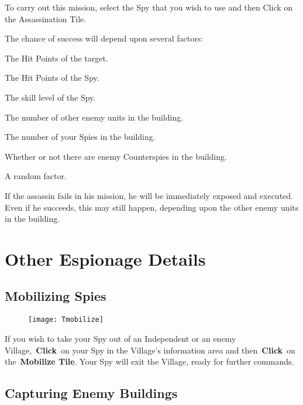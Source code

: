 To carry out this mission, select the Spy that you wish to use and then Click on the Assassination Tile.

\begin{adjustwidth}{1cm}{}
The chance of success will depend upon several factors:

The Hit Points of the target.

The Hit Points of the Spy.

The skill level of the Spy.

The number of other enemy units in the building.

The number of your Spies in the building.

Whether or not there are enemy Counterspies in the building.

A random factor.
\end{adjustwidth}

If the assassin fails in his mission, he will be immediately exposed and executed. Even if he succeeds, this may still happen, depending upon the other enemy units in the building.

\section{Other Espionage Details}

\subsection{Mobilizing Spies}

\begin{wrapfigure}{r}{0.1\textwidth}
	\vspace{-20pt}
	\begin{center}
		\texttt{[image: Tmobilize]}
	\end{center}
	\vspace{-20pt}
\end{wrapfigure}

If you wish to take your Spy out of an Independent or an enemy Village, \textbf{Click} on your Spy in the Village’s information area and then \textbf{Click} on the \textbf{Mobilize Tile}. Your Spy will exit the Village, ready for further commands.

\subsection{Capturing Enemy Buildings}


